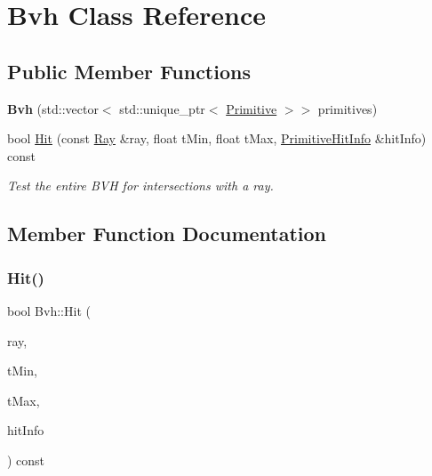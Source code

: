 \hypertarget{class_bvh}{}\section{Bvh Class Reference}
\label{class_bvh}
\subsection*{Public Member Functions}
\begin{DoxyCompactItemize}
\item 
\mbox{\label{class_bvh_a3bd0a63d8624c574d45661c7dc2bab88}} 
{\bfseries Bvh} (std\+::vector$<$ std\+::unique\+\_\+ptr$<$ \mbox{\hyperlink{class_primitive}{Primitive}} $>$$>$ primitives)
\item 
bool \mbox{\hyperlink{class_bvh_ae4e6221db6e1bb8682dbf9fca133e0e1}{Hit}} (const \mbox{\hyperlink{class_ray}{Ray}} \&ray, float t\+Min, float t\+Max, \mbox{\hyperlink{struct_primitive_hit_info}{Primitive\+Hit\+Info}} \&hit\+Info) const
\begin{DoxyCompactList}\small\item\em Test the entire B\+VH for intersections with a ray. \end{DoxyCompactList}\end{DoxyCompactItemize}


\subsection{Member Function Documentation}
\mbox{\label{class_bvh_ae4e6221db6e1bb8682dbf9fca133e0e1}} 
\subsubsection{\texorpdfstring{Hit()}{Hit()}}
{\footnotesize\ttfamily bool Bvh\+::\+Hit (\begin{DoxyParamCaption}\item[{const \mbox{\hyperlink{class_ray}{Ray}} \&}]{ray,  }\item[{float}]{t\+Min,  }\item[{float}]{t\+Max,  }\item[{\mbox{\hyperlink{struct_primitive_hit_info}{Primitive\+Hit\+Info}} \&}]{hit\+Info }\end{DoxyParamCaption}) const}



